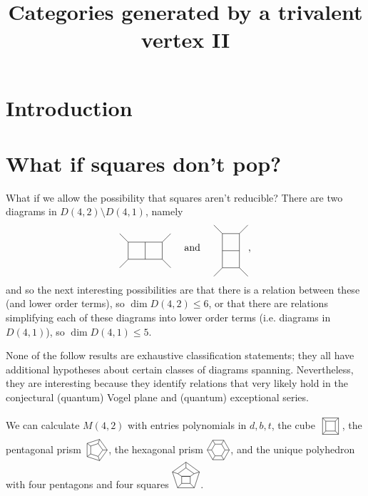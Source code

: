 \documentclass{amsart}
\title{Categories generated by a trivalent vertex II}
\newcommand{\Cube}{\prism[45]{4}}
\newcommand{\PentPrism}{\prism{5}}
\newcommand{\HexPrism}{\prism{6}}
\newcommand{\Q}{
\begin{tikzpicture}[scale=.5]
	\draw (90:1cm)--(162:1cm)--(234:1cm)--(306:1cm)--(18:1cm)--(90:1cm);
	\draw (90:.6cm)--(162:.6cm)--(-.3,0)--(.3,0)--(18:.6cm)--(90:.6cm);
	\draw (18:.6cm)--(18:1cm);
	\draw (90:.6cm)--(90:1cm);
	\draw (162:.6cm)--(162:1cm);
	\draw (234:1cm) -- (-.3,-.5);
	\draw (306:1cm) -- (.3,-.5);
	\draw (.3,0)--(-.3,0)--(-.3,-.5)--(.3,-.5)--(.3,0);
\end{tikzpicture}
}
\newcommand{\prism}[2][0]{
\begin{tikzpicture}[scale=0.8,baseline=-0.1cm]
\fill[white] (0,0) circle (0.5cm);
\foreach \x in {1, ..., #2} {
	\draw (360*\x/#2-360/#2+#1:.3cm) -- (360*\x/#2+#1:.3cm)--(360*\x/#2+#1:.5cm) -- (360*\x/#2+360/#2+#1:.5cm);
}
\end{tikzpicture}
}
\begin{document}
\maketitle

\section*{Introduction}

\section{What if squares don't pop?}


\newcommand{\twosquares}{
\begin{tikzpicture}[x=0.3cm,y=0.3cm,baseline]
\draw (-3,2) -- (-2,1) -- (2,1) -- (3,2);
\draw (-3,-2) -- (-2,-1) -- (2,-1) -- (3,-2);
\draw (-2,1) -- (-2,-1) (0,1) -- (0,-1) (2,1) -- (2,-1);
\end{tikzpicture}
}
\newcommand{\twosquaresv}{
\begin{tikzpicture}[x=0.3cm,y=0.3cm,baseline,rotate=90]
\draw (-3,2) -- (-2,1) -- (2,1) -- (3,2);
\draw (-3,-2) -- (-2,-1) -- (2,-1) -- (3,-2);
\draw (-2,1) -- (-2,-1) (0,1) -- (0,-1) (2,1) -- (2,-1);
\end{tikzpicture}
}


What if we allow the possibility that squares aren't reducible? There are two diagrams  in $D(4,2) \setminus D(4,1)$, namely $$\twosquares \quad \text{ and } \quad \twosquaresv,$$ and so the next interesting possibilities are that there is a relation between these (and lower order terms), so $\dim D(4,2) \leq 6$, or that there are relations simplifying each of these diagrams into lower order terms (i.e. diagrams in $D(4,1)$), so $\dim D(4,1) \leq 5$.

None of the follow results are exhaustive classification statements; they all have additional hypotheses about certain classes of diagrams spanning. Nevertheless, they are interesting because they identify relations that very likely hold in the conjectural (quantum) Vogel plane and (quantum) exceptional series.

We can calculate $M(4,2)$ with entries polynomials in $d, b, t$, the cube $\Cube$, the pentagonal prism $\PentPrism$, the hexagonal prism $\HexPrism$, and the unique polyhedron with four pentagons and four squares $\Q$.
\end{document}

